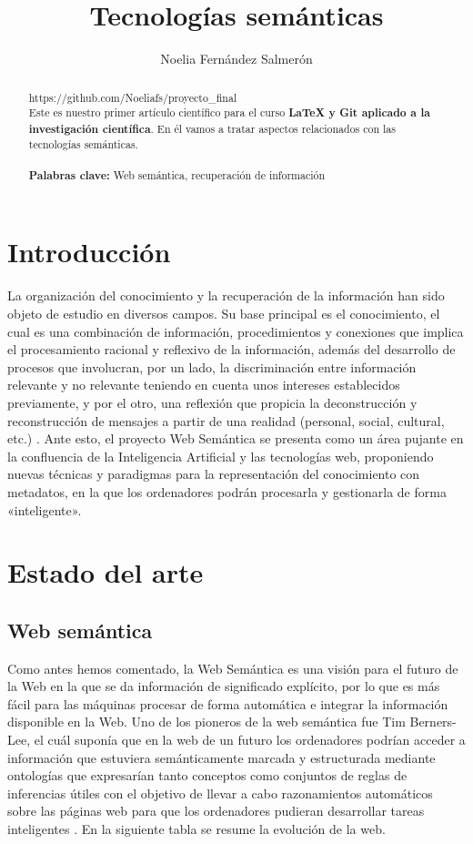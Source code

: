 \documentclass{article}
\title{Tecnologías semánticas}
\author{Noelia Fernández Salmerón }
\begin{document}
\maketitle
\begin{abstract}
https://github.com/Noeliafs/proyecto\_final\\
Este es nuestro primer artículo científico para el curso {\bf LaTeX y Git aplicado a la investigación científica}. En él vamos a tratar aspectos relacionados con las tecnologías semánticas.\\
\\
{\bf Palabras clave:} Web semántica, recuperación de información
\end{abstract}
\section{Introducción}
La organización del conocimiento y la recuperación de la información han sido objeto de estudio en diversos campos. Su base principal es el conocimiento, el cual es una combinación de información, procedimientos y conexiones que implica el procesamiento racional y reflexivo de la información, además del desarrollo de procesos que involucran, por un lado, la discriminación entre información relevante y no relevante teniendo en cuenta unos intereses establecidos previamente, y por el otro, una reflexión que propicia la deconstrucción y reconstrucción de mensajes a partir de una
realidad (personal, social, cultural, etc.) \cite{Pena2011}.
Ante esto, el proyecto Web Semántica se presenta como un área pujante en la confluencia de la Inteligencia Artificial y las tecnologías web, proponiendo nuevas técnicas y paradigmas para la representación del conocimiento con metadatos, en la que los ordenadores podrán procesarla y gestionarla de forma «inteligente»\cite{Garcia2005}. 
\section{Estado del arte}
\subsection{Web semántica}
Como antes hemos comentado, la Web Semántica es una visión para el futuro de la Web en la que se da información de significado explícito, por lo que es más fácil para las máquinas procesar de forma automática e integrar la información disponible en la Web. Uno de los pioneros de la web semántica fue Tim Berners-Lee, el cuál suponía que en la web de un futuro los ordenadores podrían acceder a información que estuviera semánticamente marcada y estructurada mediante ontologías que expresarían tanto conceptos como conjuntos de reglas de inferencias útiles con el objetivo de llevar a cabo razonamientos automáticos sobre las páginas web para que los ordenadores pudieran desarrollar tareas inteligentes \cite{Codina2009}. En la siguiente tabla se resume la evolución de la web.
\end{document}
